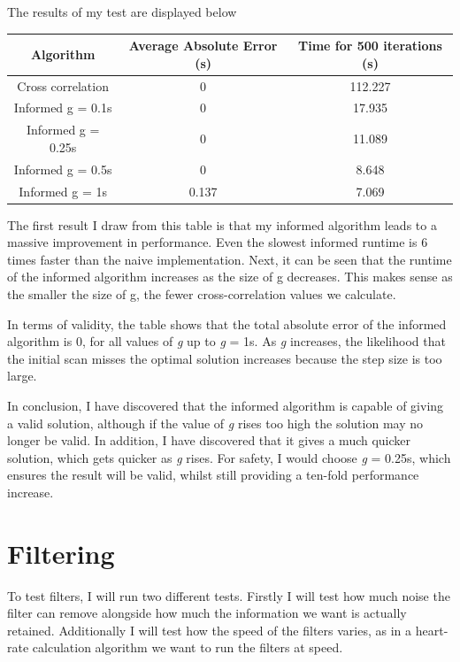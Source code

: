 \documentclass[12pt,a4paper,twoside,openright]{report}
\begin{document}
The results of my test are displayed below 
\begin{center}
\begin{tabular}{ | c | c | c | }
	\hline
	Algorithm & Average Absolute Error (s) & Time for 500
	iterations (s)\\ 
	\hline
	Cross correlation & 0 & 112.227 \\  
	Informed g = 0.1s & 0 & 17.935 \\    
	Informed g = 0.25s & 0 & 11.089 \\    
	Informed g = 0.5s & 0 & 8.648 \\    
	Informed g = 1s & 0.137 & 7.069  \\
	\hline
   \end{tabular}
\end{center}

The first result I draw from this table is that my informed algorithm leads to
a massive improvement in performance. Even the slowest informed runtime is 6
times faster than the naive implementation. Next, it can be seen that the
runtime of the informed algorithm increases as the size of g decreases. This
makes sense as the smaller the size of g, the fewer cross-correlation values
we calculate.

In terms of validity, the table shows that the total absolute error of the
informed algorithm is 0, for all values of \emph{g} up to \emph{g} = 1s. As
\emph{g} increases, the likelihood that the initial scan misses the optimal
solution increases because the step size is too large. 

In conclusion, I have discovered that the informed algorithm is capable of
giving a valid solution, although if the value of \emph{g} rises too high the
solution may no longer be valid. In addition, I have discovered that it gives
a much quicker solution, which gets quicker as \emph{g} rises. For safety, I
would choose \emph{g} = 0.25s, which ensures the result will be valid, whilst
still providing a ten-fold performance increase.


\section{Filtering}

To test filters, I will run two different tests. Firstly I will test how much
noise the filter can remove alongside how much the information we want is
actually retained. Additionally
I will test how the speed of the filters
varies, as in a heart-rate calculation algorithm we want to run the filters at
speed.
\end{document}

